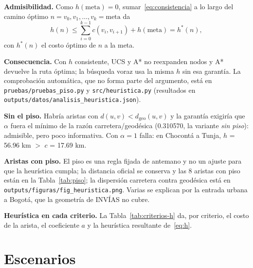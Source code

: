 \documentclass[12pt,a4paper]{article}
\begin{document}
\textbf{Admisibilidad.} Como $h(\text{meta}) = 0$, sumar~\eqref{eq:consistencia}
a lo largo del camino óptimo $n = v_0, v_1, \dots, v_k = \text{meta}$ da
\begin{equation}\label{eq:admisibilidad}
h(n) \le \sum_{i=0}^{k-1} c(v_i, v_{i+1}) + h(\text{meta}) = h^{*}(n),
\end{equation}
con $h^{*}(n)$ el costo óptimo de $n$ a la meta.

\textbf{Consecuencia.} Con $h$ consistente, UCS y A* no reexpanden nodos y A*
devuelve la ruta óptima; la búsqueda voraz usa la misma $h$ sin esa garantía.
La comprobación automática, que no forma parte del argumento, está en
\texttt{pruebas/pruebas\_piso.py} y \texttt{src/heuristica.py} (resultados en
\nolinkurl{outputs/datos/analisis_heuristica.json}).

\textbf{Sin el piso.} Habría aristas con $d(u,v) < d_{\mathrm{geo}}(u,v)$ y la
garantía exigiría que $\alpha$ fuera el mínimo de la razón
carretera/geodésica (0.310570, la variante \emph{sin piso}): admisible, pero
poco informativa. Con $\alpha = 1$ falla: en Chocontá a Tunja, $h$ = 56.96 km $>$ $c$ = 17.69 km.

\textbf{Aristas con piso.} El piso es una regla fijada de antemano y no un
ajuste para que la heurística cumpla; la distancia oficial se conserva y las 8
aristas con piso están en la Tabla~\ref{tab:piso}; la dispersión carretera contra geodésica está en \nolinkurl{outputs/figuras/fig_heuristica.png}. Varias se explican por la
entrada urbana a Bogotá, que la geometría de INVÍAS no cubre.

\textbf{Heurística en cada criterio.} La Tabla~\ref{tab:criterios-h} da, por
criterio, el costo de la arista, el coeficiente $a$ y la heurística
resultante de~\eqref{eq:h}.

\begin{table}[!htbp]
\centering
\caption{Costo de la arista $c(u,v) = a\,d + b$ y heurística por criterio. Fuente: elaboración propia}
\label{tab:criterios-h}
\footnotesize\setlength{\tabcolsep}{3pt}


\end{table}

\section{Escenarios}

\begin{table}[!htbp]
\centering
\caption{Escenarios origen-destino}
\label{tab:escenarios}
\small
\setlength{\tabcolsep}{4pt}

\end{table}
\end{document}

